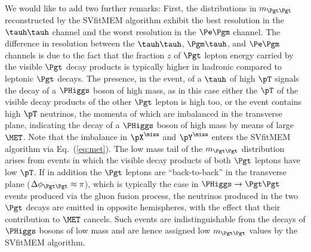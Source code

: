 We would like to add two further remarks:
First, the distributions in $m_{\Pgt\Pgt}$ reconstructed by the SVfitMEM algorithm 
exhibit the best resolution in the $\tauh\tauh$ channel and the worst resolution in the $\Pe\Pgm$ channel.
The difference in resolution between the $\tauh\tauh$, $\Pgm\tauh$, and $\Pe\Pgm$ channels
is due to the fact that the fraction $z$ of $\Pgt$ lepton energy carried by the visible $\Pgt$ decay
products is typically higher in hadronic compared to leptonic $\Pgt$ decays.
The presence, in the event, of a $\tauh$ of high $\pT$ signals the decay of a
$\PHiggs$ boson of high mass,
as in this case either the $\pT$ of the visible decay products of the
other $\Pgt$ lepton is high too,
or the event contains high $\pT$ neutrinos, the momenta of which are imbalanced in the transverse plane,
indicating the decay of a $\PHiggs$ boson of high mass  by means of large $\MET$.
Note that the imbalance in $\pX^{\miss}$ and $\pY^{\miss}$ enters the SVfitMEM algorithm via Eq.~(\ref{eq:met}).
The low mass tail of the $m_{\Pgt\Pgt}$ distribution arises from events in which the visible decay products of both $\Pgt$ leptons have low $\pT$.
If in addition the $\Pgt$ leptons are ``back-to-back'' in the transverse plane ($\Delta\phi_{\Pgt\Pgt} \approx \pi$),
which is typically the case in $\PHiggs \to \Pgt\Pgt$ events produced via the gluon fusion process,
the neutrinos produced in the two $\Pgt$ decays are emitted in opposite hemispheres, 
with the effect that their contribution to $\MET$ cancels.
Such events are indistinguishable from the decays of $\PHiggs$ bosons of low mass
and are hence assigned low $m_{\Pgt\Pgt}$ values by the SVfitMEM algorithm.

